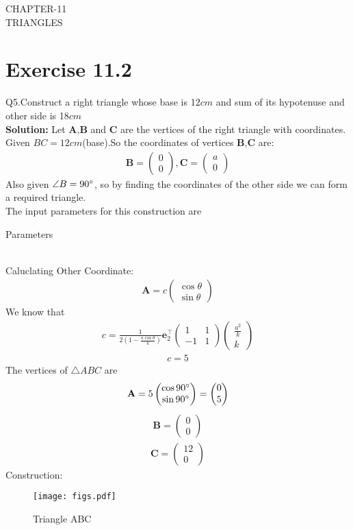 \documentclass{article}
\newcommand{\myvec}[1]{\ensuremath{\begin{pmatrix}#1\end{pmatrix}}}
\let\vec\mathbf
\begin{document}
\begin{center}
        \textbf\large{CHAPTER-11 \\ TRIANGLES}
\end{center}
\section{Exercise 11.2}
Q5.Construct a right triangle whose base is 12$cm$ and sum of its hypotenuse and other side is 18$cm$ \\
\textbf{Solution:}
Let $\vec{A}$,$\vec{B}$ and $\vec{C}$ are the vertices of the right triangle with coordinates.
Given $BC=12cm$(base).So the coordinates of vertices $\vec{B}$,$\vec{C}$ are:
\begin{align}
{
\vec{B} =\myvec{0\\0},\vec{C} =\myvec{a\\0}
}
\end{align}
Also given $\angle{B}=90\degree$, so by finding the coordinates of the other side we can form a required triangle. \\
 The input parameters for this construction are
 \begin{table}[h]
   \centering
   
   \caption{Parameters}
   \label{tab:Table1}
\end{table}\\
Caluclating Other Coordinate:
  \begin{align}
	  \vec{A} = c\myvec{\cos{\theta} \\ \sin{\theta}}
   \end{align}
We know that\\
\begin{align}  
	c = \frac{1}{2(1-\frac{a\cos{\theta}}{k})}\vec{e}_2^{\top}\myvec{1 & 1\\-1 & 1}\myvec{\frac{a^2}{k}\\k}
     \end{align}
  \begin{align}
	  c = 5
  \end{align}  
The vertices of $\triangle ABC$ are \\
\begin{align}
\vec{A} = 5\myvec{\cos 90\degree\\\sin 90\degree}
  = \myvec{0\\5}
\end{align}
\begin{align}
 \vec{B} = \myvec{0\\0}
\end{align}
\begin{align}
 \vec{C} = \myvec{12\\0}
 \end{align}        
Construction: 
\begin{figure}[h]
 \begin{center}
  \texttt{[image: figs.pdf]}
 \end{center}
 \caption{Triangle ABC}
 \label{fig:Fig1}
\end{figure}
\end{document}
